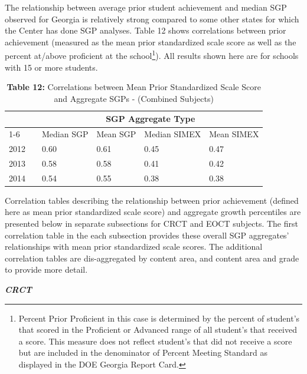 \documentclass[12pt]{article}
\begin{document}
The relationship between average prior student achievement and median
SGP observed for Georgia is relatively strong compared to some other
states for which the Center has done SGP analyses. Table 12 shows
correlations between prior achievement (measured as the mean prior
standardized scale score as well as the percent at/above proficient at
the school\footnote{Percent Prior Proficient in this case is determined
  by the percent of student's that scored in the Proficient or Advanced
  range of all student's that received a score. This measure does not
  reflect student's that did not receive a score but are included in the
  denominator of Percent Meeting Standard as displayed in the DOE
  Georgia Report Card.}). All results shown here are for schools with 15
or more students.

\begin{table}[H]
\caption*{\textbf{Table 12:} Correlations between Mean Prior Standardized Scale Score and Aggregate SGPs - (Combined Subjects)\label{table12}} 
\begin{center}
\begin{tabular}{lcllll}
\hline\hline
\multicolumn{1}{c}{\bfseries }&\multicolumn{1}{c}{\bfseries }&\multicolumn{4}{c}{\bfseries SGP Aggregate Type}\tabularnewline
\cline{1-6}
\multicolumn{1}{c}{Year}&\multicolumn{1}{c}{}&\multicolumn{1}{c}{Median SGP}&\multicolumn{1}{c}{Mean SGP}&\multicolumn{1}{c}{Median SIMEX}&\multicolumn{1}{c}{Mean SIMEX}\tabularnewline
\hline
2012&&0.60&0.61&0.45&0.47\tabularnewline
2013&&0.58&0.58&0.41&0.42\tabularnewline
2014&&0.54&0.55&0.38&0.38\tabularnewline
\hline
\end{tabular}\end{center}

\end{table}

Correlation tables describing the relationship between prior achievement
(defined here as mean prior standardized scale score) and aggregate
growth percentiles are presented below in separate subsections for CRCT
and EOCT subjects. The first correlation table in the each subsection
provides these overall SGP aggregates' relationships with mean prior
standardized scale scores. The additional correlation tables are
dis-aggregated by content area, and content area and grade to provide
more detail.

\textbf{\emph{CRCT}}
\end{document}
